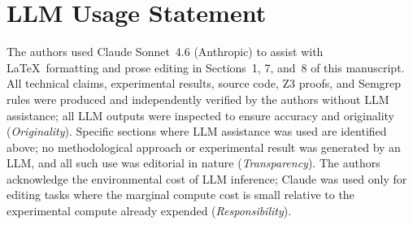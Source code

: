 \documentclass[conference,compsoc]{IEEEtran}
\begin{document}
\section*{LLM Usage Statement}
\noindent The authors used Claude Sonnet~4.6 (Anthropic) to assist with
\LaTeX\ formatting and prose editing in Sections~1, 7, and~8 of this
manuscript.
All technical claims, experimental results, source code, Z3 proofs,
and Semgrep rules were produced and independently verified by the
authors without LLM assistance; all LLM outputs were inspected
to ensure accuracy and originality (\textit{Originality}).
Specific sections where LLM assistance was used are identified above;
no methodological approach or experimental result was generated by
an LLM, and all such use was editorial in nature (\textit{Transparency}).
The authors acknowledge the environmental cost of LLM inference;
Claude was used only for editing tasks where the marginal compute
cost is small relative to the experimental compute already expended
(\textit{Responsibility}).
\end{document}
